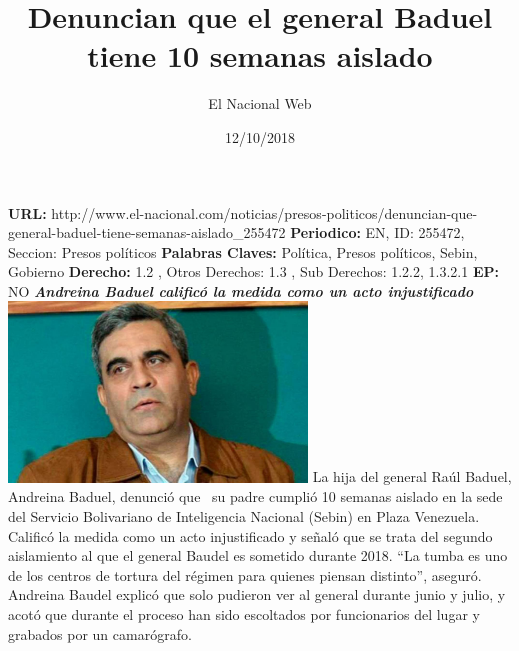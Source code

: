 \documentclass{article}%
\title{\textbf{Denuncian que el general Baduel tiene 10 semanas aislado}}%
\author{El Nacional Web}%
\date{12/10/2018}%
\begin{document}
%
\normalsize%
\maketitle%
\textbf{URL: }%
http://www.el{-}nacional.com/noticias/presos{-}politicos/denuncian{-}que{-}general{-}baduel{-}tiene{-}semanas{-}aislado\_255472\newline%
%
\textbf{Periodico: }%
EN, %
ID: %
255472, %
Seccion: %
Presos políticos\newline%
%
\textbf{Palabras Claves: }%
Política, Presos políticos, Sebin, Gobierno\newline%
%
\textbf{Derecho: }%
1.2%
, Otros Derechos: %
1.3%
, Sub Derechos: %
1.2.2, 1.3.2.1%
\newline%
%
\textbf{EP: }%
NO\newline%
\newline%
%
\textbf{\textit{Andreina Baduel calificó la medida como un acto injustificado~}}%
\newline%
\newline%
%
\includegraphics[width=300px]{77.jpg}%
\newline%
%
La hija del general Raúl Baduel, Andreina Baduel, denunció que~ su padre cumplió 10 semanas aislado en la sede del Servicio Bolivariano de Inteligencia Nacional (Sebin) en Plaza Venezuela.%
\newline%
%
Calificó la medida como un acto injustificado y señaló que se trata del segundo aislamiento al que el general Baudel es sometido durante 2018.%
\newline%
%
“La tumba es uno de los centros de tortura del régimen para quienes piensan distinto”, aseguró.%
\newline%
%
Andreina Baudel explicó que solo pudieron ver al general durante junio y julio, y acotó que durante el proceso han sido escoltados por funcionarios del lugar y grabados por un camarógrafo.%
\newline%
%
\end{document}
